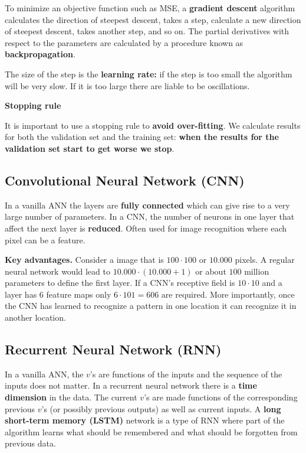 To minimize an objective function such as MSE, a \textbf{gradient descent} algorithm calculates the direction of steepest descent, takes a step, calculate a new direction of steepest descent, takes another step, and so on. The partial derivatives with respect to the parameters are calculated by a procedure known as \textbf{backpropagation}.

The size of the step is the \textbf{learning rate:} if the step is too small the algorithm will be very slow. If it is too large there are liable to be oscillations.

\textbf{Stopping rule}

It is important to use a stopping rule to \textbf{avoid over-fitting}. We calculate results for both the validation set and the training set: \textbf{when the results for the validation set start to get worse we stop}.

\subsection{Convolutional Neural Network (CNN)}

In a vanilla ANN the layers are \textbf{fully connected} which can give rise to a very large number of parameters. In a CNN, the number of neurons in one layer that affect the next layer is \textbf{reduced}. Often used for image recognition where each pixel can be a feature.

\textbf{Key advantages.} Consider a image that is $100 \cdot 100$ or $10.000$ pixels. A regular neural network would lead to $10.000\cdot(10.000+1)$ or about $100$ million parameters to define the first layer. If a CNN's receptive field is $10\cdot 10$ and a layer has $6$ feature maps only $6\cdot 101 = 606$ are required. More importantly, once the CNN has learned to recognize a pattern in one location it can recognize it in another location.


\subsection{Recurrent Neural Network (RNN)}

In a vanilla ANN, the $v$'s are functions of the inputs and the sequence of the inputs does not matter. In a recurrent neural network there is a \textbf{time dimension} in the data. The current $v$'s are made functions of the corresponding previous $v$'s (or possibly previous outputs) as well as current inputs. A \textbf{long short-term memory (LSTM)} network is a type of RNN where part of the algorithm learns what should be remembered and what should be forgotten from previous data.

